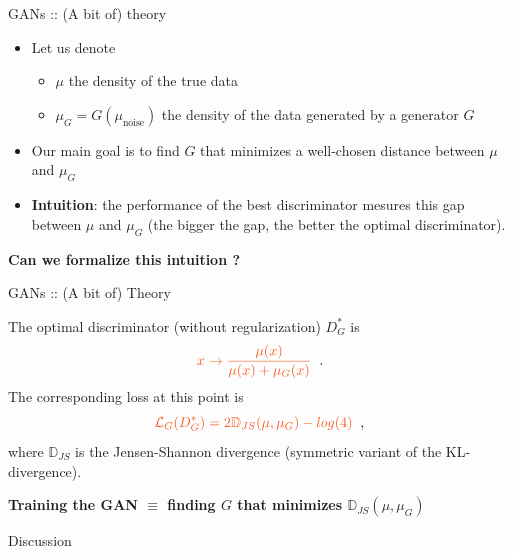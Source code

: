 \documentclass{beamer}
\begin{document}
\begin{frame}{GANs :: (A bit of) theory}
    \begin{itemize}
        \item Let us denote 
            \begin{itemize}
                \item $\mu$ the density of the true data
                \item $\mu_G = G(\mu_\text{noise})$ the density of the data generated by a generator $G$
            \end{itemize}
        \item Our main goal is to find $G$ that minimizes a well-chosen distance between $\mu$ and $\mu_G$
        \item \textcolor{cOrange}{\textbf{Intuition}}: the performance of the best discriminator mesures this gap between $\mu$ and $\mu_G$ (the bigger the gap, the better the optimal discriminator).
    \end{itemize}
    
    \begin{center}
        \textcolor{cBlue}{\textbf{Can we formalize this intuition ?}}
    \end{center}
    
    
    
\end{frame}

\begin{frame}{GANs :: (A bit of) Theory}
    \begin{theorem}
        The optimal discriminator (without regularization) $D^\ast_G$ is
        \[ \textcolor{cRed}{x \to \frac{\mu(x)}{\mu(x)+\mu_G(x)}} \;\;. \] 
        The corresponding loss at this point is 
        \[ \textcolor{cRed}{\mathcal{L}_G(D^\ast_G) = 2 \mathbb{D}_{JS}(\mu, \mu_G) - \mathop{log}(4)} \;\;, \]
        where $\mathbb{D}_{JS}$ is the Jensen-Shannon divergence (symmetric variant of the KL-divergence).
    \end{theorem}
    
    \begin{center}
        \textcolor{cBlue}{\textbf{Training the GAN $\equiv$ finding $G$ that minimizes $\mathbb{D}_{JS}(\mu, \mu_G)$}}
    \end{center}
\end{frame}

\begin{frame}{Discussion}

\cite{arjovsky2017principled}  
\end{frame}
\end{document}
